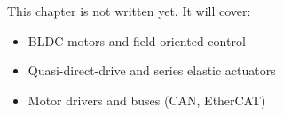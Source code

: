 \label{ch:hw6}
\begin{keyidea}
This chapter is not written yet. It will cover:
\begin{itemize}[nosep]
  \item BLDC motors and field-oriented control
  \item Quasi-direct-drive and series elastic actuators
  \item Motor drivers and buses (CAN, EtherCAT)
\end{itemize}
\end{keyidea}
